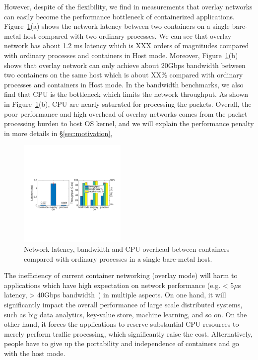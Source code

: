 However, despite of the flexibility, we find in measurements that overlay
networks can easily become the performance bottleneck of containerized
applications. 
Figure~\ref{fig:intro-exist}(a) shows the network latency between two containers
on a single bare-metal host compared with two ordinary processes. 
We can see that overlay network has about 1.2 ms latency which is XXX orders
of magnitudes compared with ordinary processes and containers in Host mode.
Moreover, Figure~\ref{fig:intro-exist}(b) shows that overlay network can only
achieve about 20Gbps bandwidth between two containers on the same host 
which is about XX\% compared with ordinary processes and containers in Host mode.
In the bandwidth benchmarks, we also find that CPU is the bottleneck which 
limits the network throughput. As shown in Figure~\ref{fig:intro-exist}(b),
CPU are nearly saturated for processing the packets. Overall, the poor
performance and high overhead of overlay networks comes from the packet processing
burden to host OS kernel, and we will explain the performance penalty in more details in \S\ref{sec:motivation},

\begin{figure}[t!]
     \centering 
     \includegraphics[width=0.46\textwidth]{figures/intro/intro_exist2.pdf} 
     \caption{Network latency, bandwidth and CPU overhead between containers compared with ordinary processes in a single bare-metal host. }
     \label{fig:intro-exist}
\end{figure} 

The inefficiency of current container networking (overlay mode) 
will harm to applications which have high expectation  on network performance (e.g. < 5$\mu$s latency, > 40Gbps bandwidth~\cite{?}) in multiple aspects. 
On one hand,
it will significantly impact the overall performance of large scale distributed systems, such as big data analytics, key-value store, machine learning, and so on. On the other hand, it forces the applications to reserve substantial CPU
resources to merely perform traffic processing, which significantly raise the 
cost. Alternatively, people have to give up the portability and independence
of containers and go with the host mode. 


